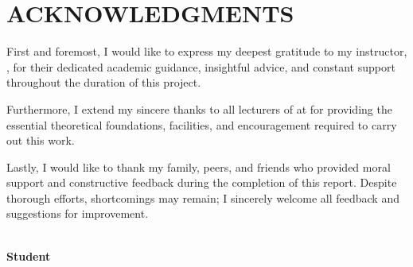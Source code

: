 \chapter*{ACKNOWLEDGMENTS}

First and foremost, I would like to express my deepest gratitude to my instructor, \textbf{\InstructorName}, for their dedicated academic guidance, insightful advice, and constant support throughout the duration of this project.

Furthermore, I extend my sincere thanks to all lecturers of \textbf{\InstituteName} at \textbf{\UnivName} for providing the essential theoretical foundations, facilities, and encouragement required to carry out this work.

Lastly, I would like to thank my family, peers, and friends who provided moral support and constructive feedback during the completion of this report. Despite thorough efforts, shortcomings may remain; I sincerely welcome all feedback and suggestions for improvement.

\vspace{1.5cm}
\begin{flushright}
    \textit{\LocationDate}\\[0.3cm]
    \textbf{Student}\\[2cm]
    \textit{\StudentName}
\end{flushright}
